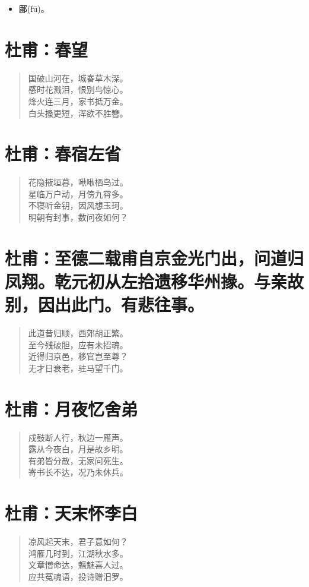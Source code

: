 \documentclass[12pt,oneside]{book}
\newenvironment{shici}{%
\begin{verse}\centering\yanti\large\hspace{12pt}}{\end{verse}}
\begin{document}
\begin{common-format}
\begin{itemize}
\item 鄜(fū)。
\end{itemize}

\chapter{杜甫：春望}
\begin{shici}
国破山河在，城春草木深。\\
感时花溅泪，恨别鸟惊心。\\
烽火连三月，家书抵万金。\\
白头搔更短，浑欲不胜簪。
\end{shici}

\chapter{杜甫：春宿左省}
\begin{shici}
花隐掖垣暮，啾啾栖鸟过。\\
星临万户动，月傍九霄多。\\
不寝听金钥，因风想玉珂。\\
明朝有封事，数问夜如何？
\end{shici}

\chapter{杜甫：至德二载甫自京金光门出，问道归凤翔。乾元初从左拾遗移华州掾。与亲故别，因出此门。有悲往事。}

\begin{shici}
此道昔归顺，西郊胡正繁。\\
至今残破胆，应有未招魂。\\
近得归京邑，移官岂至尊？\\
无才日衰老，驻马望千门。
\end{shici}


\chapter{杜甫：月夜忆舍弟}
\begin{shici}
戍鼓断人行，秋边一雁声。\\
露从今夜白，月是故乡明。\\
有弟皆分散，无家问死生。\\
寄书长不达，况乃未休兵。
\end{shici}

\chapter{杜甫：天末怀李白}
\begin{shici}
凉风起天末，君子意如何？\\
鸿雁几时到，江湖秋水多。\\
文章憎命达，魑魅喜人过。\\
应共冤魂语，投诗赠汨罗。
\end{shici}


\end{common-format}
\end{document}
